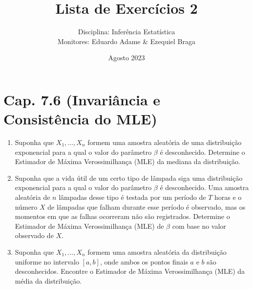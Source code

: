 \documentclass[leqno, 12pt]{article}
\title{Lista de Exercícios 2}
\author{Disciplina: Inferência Estatística \\
        Monitores: Eduardo Adame \& Ezequiel Braga}
\date{Agosto 2023}
\theoremstyle{definition}
\begin{document}
\maketitle

\section*{Cap. 7.6 (Invariância e Consistência do MLE)}

\begin{enumerate}


\item \textbf{\parencite[ex. 3, pág. 441]{DeGroot:2014}} Suponha que $X_1, \ldots, X_n$ formem uma amostra aleatória de uma distribuição exponencial para a qual o valor do parâmetro $\beta$ é desconhecido. Determine o Estimador de Máxima Verossimilhança (MLE) da mediana da distribuição.



\item \textbf{\parencite[ex. 4, pág. 441]{DeGroot:2014}} Suponha que a vida útil de um certo tipo de lâmpada siga uma distribuição exponencial para a qual o valor do parâmetro $\beta$ é desconhecido. Uma amostra aleatória de $n$ lâmpadas desse tipo é testada por um período de $T$ horas e o número $X$ de lâmpadas que falham durante esse período é observado, mas os momentos em que as falhas ocorreram não são registrados. Determine o Estimador de Máxima Verossimilhança (MLE) de $\beta$ com base no valor observado de $X$.


\item \textbf{\parencite[ex. 5, pág. 441]{DeGroot:2014}} Suponha que $X_1, \ldots, X_n$ formem uma amostra aleatória da distribuição uniforme no intervalo $[a, b]$, onde ambos os pontos finais $a$ e $b$ são desconhecidos. Encontre o Estimador de Máxima Verossimilhança (MLE) da média da distribuição.




\end{enumerate}
\end{document}
